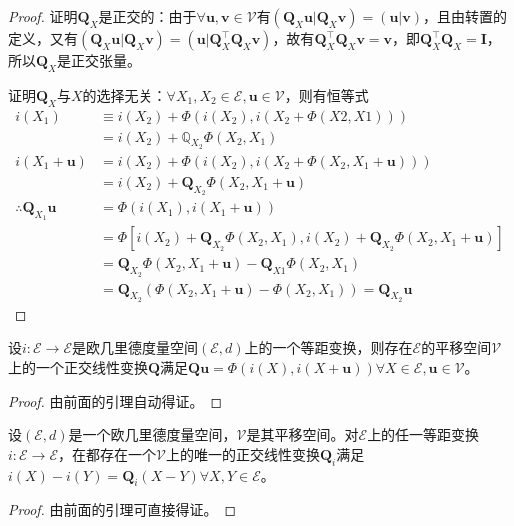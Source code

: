 \documentclass[main.tex]{subfiles}
\begin{document}
\begin{proof}
证明$\mathbf{Q}_X$是正交的：由于$\forall\mathbf{u},\mathbf{v}\in\mathcal{V}$有$\left(\mathbf{Q}_X\mathbf{u}|\mathbf{Q}_X\mathbf{v}\right)=\left(\mathbf{u}|\mathbf{v}\right)$，且由转置的定义，又有$\left(\mathbf{Q}_X\mathbf{u}|\mathbf{Q}_X\mathbf{v}\right)=\left(\mathbf{u}|\mathbf{Q}_X^\intercal\mathbf{Q}_X\mathbf{v}\right)$，故有$\mathbf{Q}_X^\intercal\mathbf{Q}_X\mathbf{v}=\mathbf{v}$，即$\mathbf{Q}_X^\intercal\mathbf{Q}_X=\mathbf{I}$，所以$\mathbf{Q}_X$是正交张量。

证明$\mathbf{Q}_X$与$X$的选择无关：$\forall X_1,X_2\in\mathcal{E},\mathbf{u}\in\mathcal{V}$，则有恒等式
\begin{align*}
i\left(X_1\right)&\equiv i\left(X_2\right)+\Phi\left(i\left(X_2\right),i\left(X_2+\Phi\left(X2,X1\right)\right)\right)\\
&=i\left(X_2\right)+\mathbb{Q}_{X_2}\Phi\left(X_2,X_1\right)\\
i\left(X_1+\mathbf{u}\right)&=i\left(X_2\right)+\Phi\left(i\left(X_2\right),i\left(X_2+\Phi\left(X_2,X_1+\mathbf{u}\right)\right)\right)\\
&=i\left(X_2\right)+\mathbf{Q}_{X_2}\Phi\left(X_2,X_1+\mathbf{u}\right)\\
\therefore \mathbf{Q}_{X_1}\mathbf{u}&=\Phi\left(i\left(X_1\right),i\left(X_1+\mathbf{u}\right)\right)\\
&=\Phi\left[i\left(X_2\right)+\mathbf{Q}_{X_2}\Phi\left(X_2,X_1\right),i\left(X_2\right)+\mathbf{Q}_{X_2}\Phi\left(X_2,X_1+\mathbf{u}\right)\right]\\
&=\mathbf{Q}_{X_2}\Phi\left(X_2,X_1+\mathbf{u}\right)-\mathbf{Q}_{X1}\Phi\left(X_2,X_1\right)\\
&=\mathbf{Q}_{X_2}\left(\Phi\left(X_2,X_1+\mathbf{u}\right)-\Phi\left(X_2,X_1\right)\right)=\mathbf{Q}_{X_2}\mathbf{u}
\end{align*}
\end{proof}

\begin{corollary}
设$i:\mathcal{E}\rightarrow\mathcal{E}$是欧几里德度量空间$\left(\mathcal{E},d\right)$上的一个等距变换，则存在$\mathcal{E}$的平移空间$\mathcal{V}$上的一个正交线性变换$\mathbf{Q}$满足$\mathbf{Qu}=\Phi\left(i\left(X\right),i\left(X+\mathbf{u}\right)\right)\forall X\in\mathcal{E},\mathbf{u}\in\mathcal{V}$。
\end{corollary}
\begin{proof}
由前面的引理自动得证。
\end{proof}

\begin{corollary}
设$\left(\mathcal{E},d\right)$是一个欧几里德度量空间，$\mathcal{V}$是其平移空间。对$\mathcal{E}$上的任一等距变换$i:\mathcal{E}\rightarrow\mathcal{E}$，在都存在一个$\mathcal{V}$上的唯一的正交线性变换$\mathbf{Q}_i$满足$i\left(X\right)-i\left(Y\right)=\mathbf{Q}_i\left(X-Y\right)\forall X,Y\in\mathcal{E}$。
\end{corollary}
\begin{proof}
由前面的引理可直接得证。
\end{proof}
\end{document}
